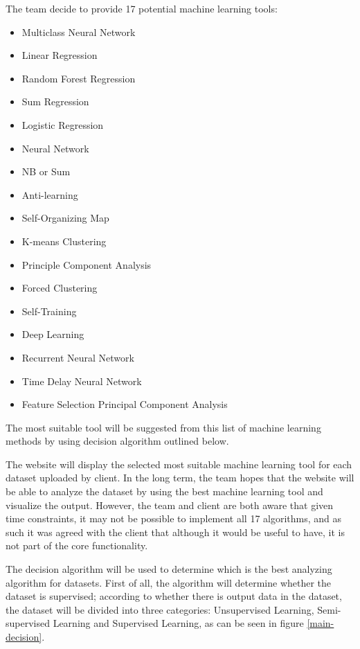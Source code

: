 \documentclass[a4paper,titlepage]{article}
\begin{document}
The team decide to provide 17 potential machine learning tools:
\begin{multicols}{2}
\begin{itemize}
  \item Multiclass Neural Network
  \item Linear Regression
  \item Random Forest Regression
  \item Sum Regression
  \item Logistic Regression
  \item Neural Network
  \item NB or Sum
  \item Anti-learning
  \item Self-Organizing Map
  \item K-means Clustering
  \item Principle Component Analysis
  \item Forced Clustering
  \item Self-Training
  \item Deep Learning
  \item Recurrent Neural Network
  \item Time Delay Neural Network
  \item Feature Selection Principal Component Analysis
\end{itemize}
\end{multicols}

The most suitable tool will be suggested from this list of machine learning methods by using decision algorithm outlined below.

The website will display the selected most suitable machine learning tool for each dataset uploaded by client. 
In the long term, the team hopes that the website will be able to analyze the dataset by using the best machine learning tool and visualize the output. 
However, the team and client are both aware that given time constraints, it may not be possible to implement all 17 algorithms, and as such it was agreed with the client that although it would be useful to have, it is not part of the core functionality.

The decision algorithm will be used to determine which is the best analyzing algorithm for datasets. 
First of all, the algorithm will determine whether the dataset is supervised; according to whether there is output data in the dataset, the dataset will be divided into three categories: Unsupervised Learning, Semi-supervised Learning and Supervised Learning, as can be seen in figure \ref{main-decision}.
\end{document}
